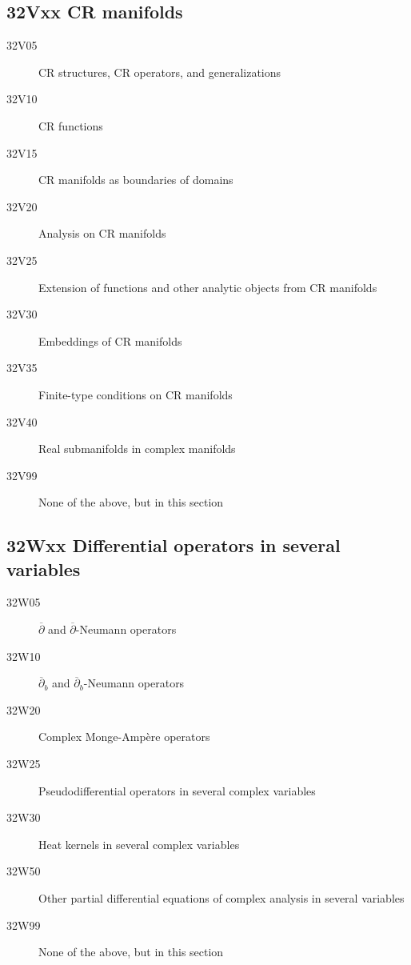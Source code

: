 \documentclass[letterpaper]{article}
\begin{document}
\subsection*{32Vxx  CR manifolds }\label{32Vxx}
\begin{description}  
\item [32V05]\label{32V05} CR structures, CR operators, and generalizations
\item [32V10]\label{32V10} CR functions
\item [32V15]\label{32V15} CR manifolds as boundaries of domains
\item [32V20]\label{32V20} Analysis on CR manifolds
\item [32V25]\label{32V25} Extension of functions and other analytic objects from CR manifolds
\item [32V30]\label{32V30} Embeddings of CR manifolds
\item [32V35]\label{32V35} Finite-type conditions on CR manifolds
\item [32V40]\label{32V40} Real submanifolds in complex manifolds
\item [32V99]\label{32V99} None of the above, but in this section
\end{description}
\subsection*{32Wxx  Differential operators in several variables }\label{32Wxx}
\begin{description}  
\item [32W05]\label{32W05} $\overline\partial$ and $\overline\partial$-Neumann operators 
\item [32W10]\label{32W10} $\overline\partial_b$ and $\overline\partial_b$-Neumann operators 
\item [32W20]\label{32W20} Complex Monge-Amp\`{e}re operators 
\item [32W25]\label{32W25} Pseudodifferential operators in several complex variables
\item [32W30]\label{32W30} Heat kernels in several complex variables
\item [32W50]\label{32W50} Other partial differential equations of complex analysis in several variables
\item [32W99]\label{32W99} None of the above, but in this section
\end{description}
\end{document}
